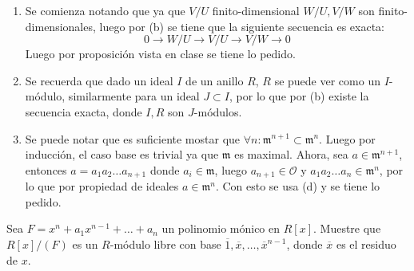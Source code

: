 \begin{sol}{2.49}
\begin{enumerate}
        \item Se comienza notando que ya que \(V/U\) finito-dimensional \(W/U,V/W\) son finito-dimensionales, luego por (b) se tiene que la siguiente secuencia es exacta:
        \[0\rightarrow W/U\rightarrow V/U\rightarrow V/W\rightarrow 0\]
        Luego por proposición vista en clase se tiene lo pedido.
        \item Se recuerda que dado un ideal \(I\) de un anillo \(R\), \(R\) se puede ver como un \(I\)-módulo, similarmente para un ideal \(J\subset I\), por lo que por (b) existe la secuencia exacta, donde \(I,R\) son \(J\)-módulos.
        \item Se puede notar que es suficiente mostar que \(\forall n:\mathfrak{m}^{n+1}\subset\mathfrak{m}^n\). Luego por inducción, el caso base es trivial ya que \(\mathfrak{m}\) es maximal. Ahora, sea \(a\in\mathfrak{m}^{n+1}\), entonces \(a=a_1a_2\dots a_{n+1}\) donde \(a_i\in\mathfrak{m}\), luego \(a_{n+1}\in\mathcal{O}\) y \(a_1a_2\dots a_n\in\mathfrak{m}^n\), por lo que por propiedad de ideales \(a\in\mathfrak{m}^n\). Con esto se usa (d) y se tiene lo pedido.
        
    \end{enumerate}
\end{sol}

\begin{prob}{2.55}
    Sea \(F=x^n+a_1x^{n-1}+\dots +a_n\) un polinomio mónico en \(R[x]\). Muestre que \(R[x]/(F)\) es un \(R\)-módulo libre con base \(\overline{1},\overline{x},\dots ,\overline{x}^{n-1}\), donde \(\overline{x}\) es el residuo de \(x\).
\end{prob}

\begin{sol}{2.55}

\end{sol}



